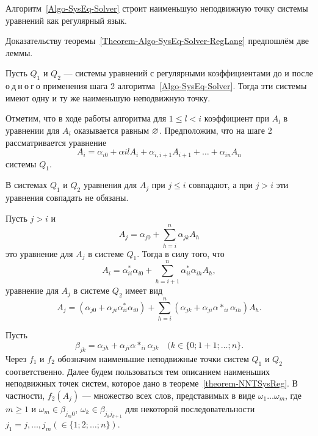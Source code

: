 \begin{mytheorem}
\label{Theorem-Algo-SysEq-Solver-RegLang}
Алгоритм~\ref{Algo-SysEq-Solver} строит наименьшую неподвижную точку системы уравнений как регулярный язык.
\end{mytheorem}

Доказательству теоремы~\ref{Theorem-Algo-SysEq-Solver-RegLang} предпошлём две леммы.

\begin{mylemma}
\label{RegSysSolver-lemma1}
Пусть $Q_1$ и $Q_2$ --- системы уравнений с регулярными коэффициентами до и после о$~$д$~$н$~$о$~$г$~$о применения шага 2 алгоритма~\ref{Algo-SysEq-Solver}. Тогда эти системы имеют одну и ту же наименьшую неподвижную точку.
\end{mylemma}

\begin{myproof}
Отметим, что в ходе работы алгоритма для $1\le l<i$ коэффициент при $A_l$ в уравнении для $A_i$ оказывается равным $\varnothing$. Предположим, что на шаге 2 рассматривается уравнение
\[
A_i = \alpha_{i0} + \alpha{il}A_i + \alpha_{i,i+1}A_{i+1} + \ldots + \alpha_{in}A_n
\]
системы $Q_1$.

В системах $Q_1$ и $Q_2$ уравнения для $A_j$ при $j\le i$ совпадают, а при $j>i$ эти уравнения совпадать не обязаны.

Пусть $j>i$ и
\begin{equation}
\label{eq231}
A_j = \alpha_{j0} + \underset{h=i}{\overset{n}{\sum}} \alpha_{jk}A_h	%
\end{equation}
это уравнение для $A_j$ в системе $Q_1$. Тогда в силу того, что
\begin{equation*}
	A_i = \alpha^*_{ii}\alpha_{i0} + \underset{h=i+1}{\overset{n}{\sum}} \alpha^*_{ii}\alpha_{ih}A_h,
\end{equation*}
уравнение для $A_j$ в системе $Q_2$ имеет вид
\begin{equation}
\label{eq232}
A_j = (\alpha_{j0}+\alpha_{ji}\alpha^*_{ii}\alpha_{i0}) + \underset{h=i}{\overset{n}{\sum}} (\alpha_{jk}+\alpha_{ji}\alpha*_{ii}\alpha_{ih})A_h.
\end{equation}

Пусть
\begin{equation*}	\beta_{jk}=\alpha_{jh}+\alpha_{ji}\alpha*_{ii}\alpha_{jk} \quad	(k\in\{0;1+1;\ldots ;n\}.
\end{equation*}
Через $f_1$ и $f_2$ обозначим наименьшие неподвижные точки систем $Q_1$ и $Q_2$ соответственно. Далее будем пользоваться тем описанием наименьших неподвижных точек систем, которое дано в теореме~\ref{theorem-NNTSysReg}. В частности, $f_2(A_j)$ --- множество всех слов, представимых в виде $\omega_1\ldots\omega_m$, где $m\ge 1$ и $\omega_m\in\beta_{j_m0}$, $\omega_k\in\beta_{j_{k}j_{k+1}}$ для некоторой последовательности $j_1=j, \dots , j_{m} (\in\{1;2;\ldots ;n\})$.


\end{myproof}
